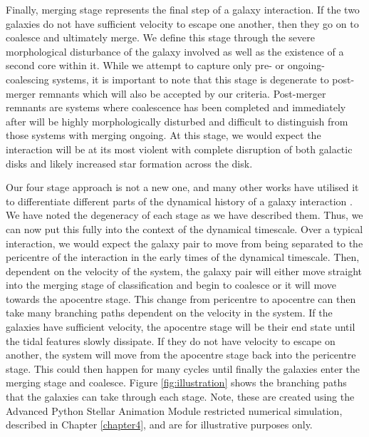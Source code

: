 Finally, merging stage represents the final step of a galaxy interaction. If the two galaxies do not have sufficient velocity to escape one another, then they go on to coalesce and ultimately merge. We define this stage through the severe morphological disturbance of the galaxy involved as well as the existence of a second core within it. While we attempt to capture only pre- or ongoing-coalescing systems, it is important to note that this stage is degenerate to post-merger remnants which will also be accepted by our criteria. Post-merger remnants are systems where coalescence has been completed and immediately after will be highly morphologically disturbed and difficult to distinguish from those systems with merging ongoing. At this stage, we would expect the interaction will be at its most violent with complete disruption of both galactic disks and likely increased star formation across the disk. 

Our four stage approach is not a new one, and many other works have utilised it to differentiate different parts of the dynamical history of a galaxy interaction \citep{2022ApJ...937...97C, 2023ApJ...952..122G}. We have noted the degeneracy of each stage as we have described them. Thus, we can now put this fully into the context of the dynamical timescale. Over a typical interaction, we would expect the galaxy pair to move from being separated to the pericentre of the interaction in the early times of the dynamical timescale. Then, dependent on the velocity of the system, the galaxy pair will either move straight into the merging stage of classification and begin to coalesce or it will move towards the apocentre stage. This change from pericentre to apocentre can then take many branching paths dependent on the velocity in the system. If the galaxies have sufficient velocity, the apocentre stage will be their end state until the tidal features slowly dissipate. If they do not have velocity to escape on another, the system will move from the apocentre stage back into the pericentre stage. This could then happen for many cycles until finally the galaxies enter the merging stage and coalesce. Figure \ref{fig:illustration} shows the branching paths that the galaxies can take through each stage. Note, these are created using the Advanced Python Stellar Animation Module restricted numerical simulation, described in Chapter \ref{chapter4}, and are for illustrative purposes only.

